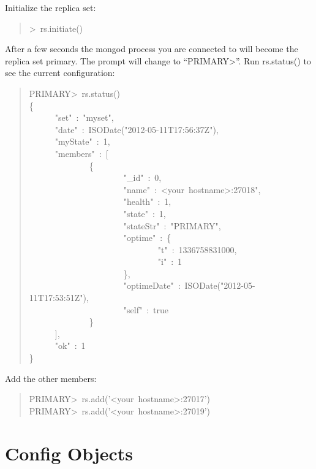 \documentclass[letter]{article}
\begin{document}
Initialize the replica set:
%
\begin{quote}{\ttfamily \raggedright \noindent
>~rs.initiate()
}
\end{quote}

After a few seconds the mongod process you are connected to will become
the replica set primary. The prompt will change to ``PRIMARY>''. Run rs.status()
to see the current configuration:
%
\begin{quote}{\ttfamily \raggedright \noindent
PRIMARY>~rs.status()\\
\{\\
~~~~~~"set"~:~"myset",\\
~~~~~~"date"~:~ISODate("2012-05-11T17:56:37Z"),\\
~~~~~~"myState"~:~1,\\
~~~~~~"members"~:~{[}\\
~~~~~~~~~~~~~~\{\\
~~~~~~~~~~~~~~~~~~~~~~"\_id"~:~0,\\
~~~~~~~~~~~~~~~~~~~~~~"name"~:~<your~hostname>:27018",\\
~~~~~~~~~~~~~~~~~~~~~~"health"~:~1,\\
~~~~~~~~~~~~~~~~~~~~~~"state"~:~1,\\
~~~~~~~~~~~~~~~~~~~~~~"stateStr"~:~"PRIMARY",\\
~~~~~~~~~~~~~~~~~~~~~~"optime"~:~\{\\
~~~~~~~~~~~~~~~~~~~~~~~~~~~~~~"t"~:~1336758831000,\\
~~~~~~~~~~~~~~~~~~~~~~~~~~~~~~"i"~:~1\\
~~~~~~~~~~~~~~~~~~~~~~\},\\
~~~~~~~~~~~~~~~~~~~~~~"optimeDate"~:~ISODate("2012-05-11T17:53:51Z"),\\
~~~~~~~~~~~~~~~~~~~~~~"self"~:~true\\
~~~~~~~~~~~~~~\}\\
~~~~~~{]},\\
~~~~~~"ok"~:~1\\
\}
}
\end{quote}

Add the other members:
%
\begin{quote}{\ttfamily \raggedright \noindent
PRIMARY>~rs.add('<your~hostname>:27017')\\
PRIMARY>~rs.add('<your~hostname>:27019')
}
\end{quote}


\section{Config Objects%
  \label{config-objects}%
}
\end{document}
